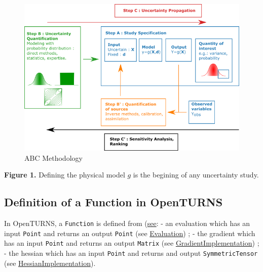 \documentclass[11pt]{article}
\begin{document}
\begin{figure}
\centering
\includegraphics{MethodologieIncertitude-EN_arial.png}
\caption{ABC Methodology}
\end{figure}

\textbf{Figure 1.} Defining the physical model \(g\) is the begining of
any uncertainty study.

    \hypertarget{definition-of-a-function-in-openturns}{%
\subsection{Definition of a Function in
OpenTURNS}\label{definition-of-a-function-in-openturns}}

In OpenTURNS, a \texttt{Function} is defined from
(\href{https://github.com/openturns/openturns/blob/18146c0a82819c3f8d8e691a119a93c155429422/lib/src/Base/Func/openturns/Function.hxx\#L74}{see}:
- an evaluation which has an input \texttt{Point} and returns an output
\texttt{Point} (see
\href{https://github.com/openturns/openturns/blob/18146c0a82819c3f8d8e691a119a93c155429422/lib/src/Base/Func/openturns/Evaluation.hxx\#L83}{Evaluation})
; - the gradient which has an input \texttt{Point} and returns an output
\texttt{Matrix} (see
\href{https://github.com/openturns/openturns/blob/18146c0a82819c3f8d8e691a119a93c155429422/lib/src/Base/Func/openturns/GradientImplementation.hxx\#L82}{GradientImplementation})
; - the hessian which has an input \texttt{Point} and returns and output
\texttt{SymmetricTensor} (see
\href{https://github.com/openturns/openturns/blob/18146c0a82819c3f8d8e691a119a93c155429422/lib/src/Base/Func/openturns/HessianImplementation.hxx\#L79}{HessianImplementation}).
\end{document}
